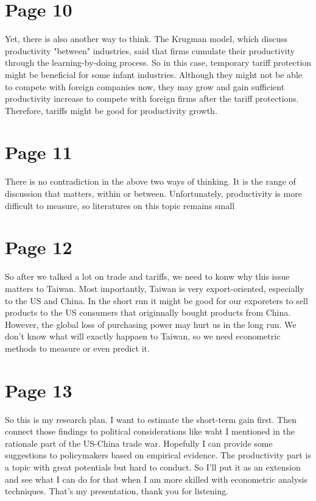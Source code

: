 \documentclass[12pt]{article}
\begin{document}
\section*{Page 10}
Yet, there is also another way to think. 
The Krugman model, which discuss productivity "between" industries, 
said that firms cumulate their productivity through the learning-by-doing process.
So in this case, temporary tariff protection might be beneficial for some infant industries. 
Although they might not be able to compete with foreign companies now, 
they may grow and gain sufficient productivity increase to compete with foreign firms after the tariff protections.
Therefore, tariffs might be good for productivity growth.

\section*{Page 11}
There is no contradiction in the above two ways of thinking.
It is the range of discussion that matters, within or between.
Unfortunately, productivity is more difficult to measure, so literatures on this topic remains small

\section*{Page 12}
So after we talked a lot on trade and tariffs, we need to konw why this issue matters to Taiwan.
Most importantly, Taiwan is very export-oriented, especially to the US and China.
In the short run it might be good for our exporeters to sell products to the US consumers that originnally bought products from China.
However, the global loss of purchasing power may hurt us in the long run.
We don't know what will exactly happaen to Taiwan, so we need econometric methods to measure or even predict it.

\section*{Page 13}
So this is my research plan. 
I want to estimate the short-term gain first.
Then connect those findings to political considerations like waht I mentioned in the rationale part of the US-China trade war.
Hopefully I can provide some suggestions to policymakers based on empirical evidence. 
The productivity part is a topic with great potentials but hard to conduct. 
So I'll put it as an extension and see what I can do for that when I am more skilled with econometric analysis techniques.
That's my presentation, thank you for listening.
\end{document}

